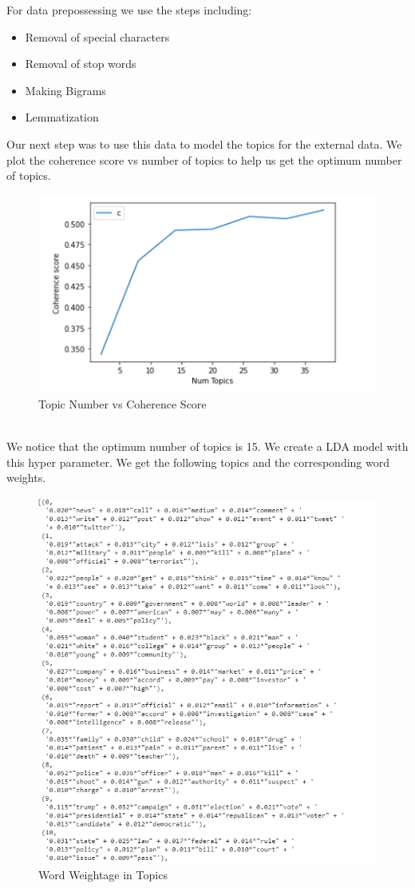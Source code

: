 \documentclass{article}
\begin{document}
For data prepossessing we use the steps including:
\begin{itemize}
	\item Removal of special characters
	\item Removal of stop words
    \item Making Bigrams 
    \item Lemmatization
\end{itemize}
Our next step was to use this data to model the topics for the external data. We plot the coherence score vs number of topics to help us get the optimum number of topics. 
\begin{figure}[H]
    \centering
    \includegraphics[scale=1.5]{score.PNG}
    \caption{Topic Number vs Coherence Score}
    \label{Topic Number vs Coherence Scorel}
\end{figure}
\\
We notice that the optimum number of topics is 15. We create a LDA model with this hyper parameter. We get the following topics and the corresponding word weights.\\
\begin{figure}[H]
    \centering
    \includegraphics[scale=0.8]{NeuRIPS2019/words.PNG}
    \caption{Word Weightage in Topics}
    \label{Word Weightage in Topics}
\end{figure}
\end{document}
